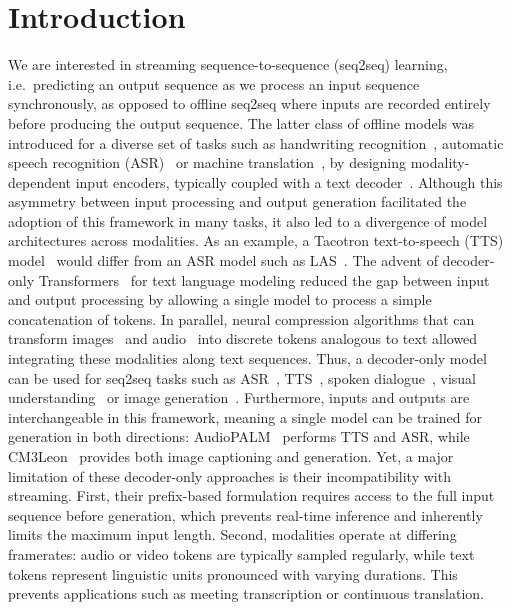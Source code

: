 \documentclass{article}
\begin{document}
\section{Introduction}
\label{sec:intro}
We are interested in streaming sequence-to-sequence (seq2seq) learning, i.e.\ predicting an output sequence as we process an input sequence synchronously, as opposed to offline seq2seq where inputs are recorded entirely before producing the output sequence. The latter class of offline models was introduced for a diverse set of tasks such as handwriting recognition~\citep{graves_ctc}, automatic speech recognition (ASR)~\citep{graves_ctc} or machine translation~\citep{bahdanau_attention,sutskever2014sequence}, by designing modality-dependent input encoders, typically coupled with a text decoder~\citep{lstm}. Although this asymmetry between input processing and output generation facilitated the adoption of this framework in many tasks, it also led to a divergence of model architectures across modalities. As an example, a Tacotron text-to-speech (TTS) model~\citep{tacotron} would differ from an ASR model such as LAS~\citep{chan2016listen}. %
The advent of decoder-only Transformers~\citep{attentionvaswani,radford2018improving} for text language modeling reduced the gap between input and output processing by allowing a single model to process a simple concatenation of tokens. In parallel, neural compression algorithms that can transform images~\citep{vqvae,Esser2020TamingTF} and audio~\citep{soundstream,encodec} into discrete tokens analogous to text allowed integrating these modalities along text sequences. Thus, a decoder-only model can be used for seq2seq tasks such as ASR~\citep{audiopalm}, TTS~\citep{valle,speartts}, spoken dialogue~\citep{moshi}, visual understanding~\citep{paligemma} or image generation~\citep{dalle}. Furthermore, inputs and outputs are interchangeable in this framework, meaning a single model can be trained for generation in both directions: AudioPALM~\citep{audiopalm} performs TTS and ASR, while CM3Leon~\citep{Yu2023ScalingAM} provides both image captioning and generation. Yet, a major limitation of these decoder-only approaches is their incompatibility with streaming. First, their prefix-based formulation requires access to the full input sequence before generation, which prevents real-time inference and inherently limits the maximum input length. Second, modalities operate at differing framerates: audio or video tokens are typically sampled regularly, while text tokens represent linguistic units pronounced with varying durations. This prevents applications such as meeting transcription or continuous translation. 
\end{document}

